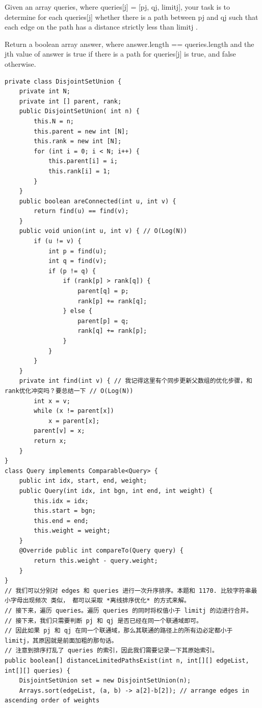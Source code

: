 \documentclass[9pt, b5paper]{article}
\begin{document}
Given an array queries, where queries[j] = [pj, qj, limitj], your task is to determine for each queries[j] whether there is a path between pj and qj such that each edge on the path has a distance strictly less than limitj .

Return a boolean array answer, where answer.length == queries.length and the jth value of answer is true if there is a path for queries[j] is true, and false otherwise.
\begin{verbatim}
private class DisjointSetUnion {
    private int N;
    private int [] parent, rank;
    public DisjointSetUnion( int n) {
        this.N = n;
        this.parent = new int [N];
        this.rank = new int [N];
        for (int i = 0; i < N; i++) {
            this.parent[i] = i;
            this.rank[i] = 1;
        }
    }
    public boolean areConnected(int u, int v) {
        return find(u) == find(v);
    }
    public void union(int u, int v) { // O(Log(N))
        if (u != v) {
            int p = find(u);
            int q = find(v);
            if (p != q) {
                if (rank[p] > rank[q]) {
                    parent[q] = p;
                    rank[p] += rank[q];
                } else {
                    parent[p] = q;
                    rank[q] += rank[p];
                }
            }
        }
    }
    private int find(int v) { // 我记得这里有个同步更新父数组的优化步骤，和rank优化冲突吗？要总结一下 // O(Log(N))
        int x = v;
        while (x != parent[x])
            x = parent[x];
        parent[v] = x;
        return x;
    }
}
class Query implements Comparable<Query> {
    public int idx, start, end, weight;
    public Query(int idx, int bgn, int end, int weight) {
        this.idx = idx;
        this.start = bgn;
        this.end = end;
        this.weight = weight;
    }
    @Override public int compareTo(Query query) {
        return this.weight - query.weight;
    }
}
// 我们可以分别对 edges 和 queries 进行一次升序排序。本题和 1170. 比较字符串最小字母出现频次 类似， 都可以采取 *离线排序优化* 的方式来解。
// 接下来，遍历 queries。遍历 queries 的同时将权值小于 limitj 的边进行合并。
// 接下来，我们只需要判断 pj 和 qj 是否已经在同一个联通域即可。
// 因此如果 pj 和 qj 在同一个联通域，那么其联通的路径上的所有边必定都小于 limitj，其原因就是前面加粗的那句话。
// 注意到排序打乱了 queries 的索引，因此我们需要记录一下其原始索引。
public boolean[] distanceLimitedPathsExist(int n, int[][] edgeList, int[][] queries) {
    DisjointSetUnion set = new DisjointSetUnion(n);
    Arrays.sort(edgeList, (a, b) -> a[2]-b[2]); // arrange edges in ascending order of weights

\end{verbatim}
\end{document}
